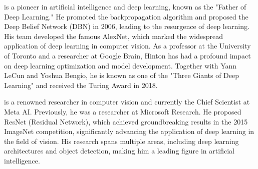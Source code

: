 \documentclass{article}
\begin{document}
\pagestyle{empty}
\noindent
\begin{minipage}[t]{0.45\linewidth}
	\noindent{}
	 is a pioneer in artificial intelligence and deep learning, known as the "Father of Deep Learning." He promoted the backpropagation algorithm and proposed the Deep Belief Network (DBN) in 2006, leading to the resurgence of deep learning. His team developed the famous AlexNet, which marked the widespread application of deep learning in computer vision. As a professor at the University of Toronto and a researcher at Google Brain, Hinton has had a profound impact on deep learning optimization and model development. Together with Yann LeCun and Yoshua Bengio, he is known as one of the "Three Giants of Deep Learning" and received the Turing Award in 2018.
\end{minipage}
\hfill
\begin{minipage}[t]{0.45\linewidth}
	\noindent{}
	 is a renowned researcher in computer vision and currently the Chief Scientist at Meta AI. Previously, he was a researcher at Microsoft Research. He proposed ResNet (Residual Network), which achieved groundbreaking results in the 2015 ImageNet competition, significantly advancing the application of deep learning in the field of vision. His research spans multiple areas, including deep learning architectures and object detection, making him a leading figure in artificial intelligence.
\end{minipage}

\vspace{2cm} %
\end{document}

